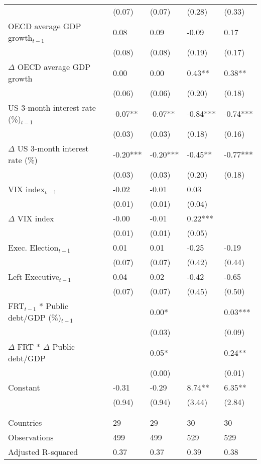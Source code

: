 \begin{tabular}{lp{3cm}p{3cm}p{3cm}p{3cm}}
   & (0.07) & (0.07) & (0.28) & (0.33) \\ 
  OECD average GDP growth$_{t-1}$ & 0.08 & 0.09 & -0.09 & 0.17 \\ 
   & (0.08) & (0.08) & (0.19) & (0.17) \\ 
  $\Delta$ OECD average GDP growth & 0.00 & 0.00 & 0.43** & 0.38** \\ 
   & (0.06) & (0.06) & (0.20) & (0.18) \\ 
  US 3-month interest rate (\%)$_{t-1}$ & -0.07** & -0.07** & -0.84*** & -0.74*** \\ 
   & (0.03) & (0.03) & (0.18) & (0.16) \\ 
  $\Delta$ US 3-month interest rate (\%) & -0.20*** & -0.20*** & -0.45** & -0.77*** \\ 
   & (0.03) & (0.03) & (0.20) & (0.18) \\ 
  VIX index$_{t-1}$ & -0.02 & -0.01 & 0.03 &  \\ 
   & (0.01) & (0.01) & (0.04) &  \\ 
  $\Delta$ VIX index & -0.00 & -0.01 & 0.22*** &  \\ 
   & (0.01) & (0.01) & (0.05) &  \\ 
  Exec. Election$_{t-1}$ & 0.01 & 0.01 & -0.25 & -0.19 \\ 
   & (0.07) & (0.07) & (0.42) & (0.44) \\ 
  Left Executive$_{t-1}$ & 0.04 & 0.02 & -0.42 & -0.65 \\ 
   & (0.07) & (0.07) & (0.45) & (0.50) \\ 
  FRT$_{t-1}$ * Public debt/GDP (\%)$_{t-1}$ &  & 0.00* &  & 0.03*** \\ 
   &  & (0.03) &  & (0.09) \\ 
  $\Delta$ FRT * $\Delta$ Public debt/GDP &  & 0.05* &  & 0.24** \\ 
   &  & (0.00) &  & (0.01) \\ 
  Constant & -0.31 & -0.29 & 8.74** & 6.35** \\ 
   & (0.94) & (0.94) & (3.44) & (2.84) \\ 
   &  &  &  &  \\ 
   &  &  &  &  \\ 
  Countries & 29 & 29 & 30 & 30 \\ 
  Observations & 499 & 499 & 529 & 529 \\ 
  Adjusted R-squared & 0.37 & 0.37 & 0.39 & 0.38 \\ 
   \hline
\end{tabular}
\endgroup
